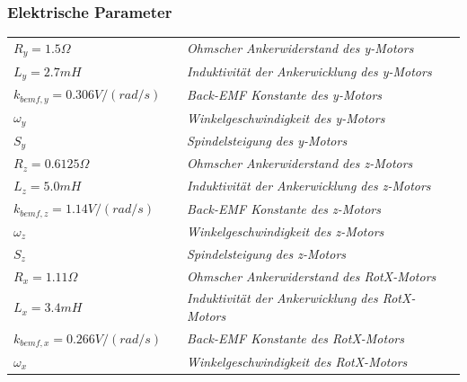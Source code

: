 \documentclass[10pt,a4paper]{iace.report}
\begin{document}
			\subsubsection{Elektrische Parameter}
				\begin{tabular}{lp{1cm}p{8.6cm}}
					$ R_{y}= 1.5 \Omega$ && \textit{Ohmscher Ankerwiderstand des y-Motors}\\
					$ L_{y}= 2.7mH$ &&\textit{Induktivität der Ankerwicklung des y-Motors} \\ 
					$ k_{bemf,y}= 0.306 V/(rad/s)$ &&\textit{Back-EMF Konstante des y-Motors} \\ 
					$ \omega_{y} $ &&\textit{Winkelgeschwindigkeit des y-Motors} \\ 
					$ S_{y} $ &&\textit{Spindelsteigung des y-Motors} \\ 
					$ R_{z}= 0.6125\Omega$ && \textit{Ohmscher Ankerwiderstand des z-Motors}\\
					$ L_{z}= 5.0mH$ &&\textit{Induktivität der Ankerwicklung des z-Motors} \\ 
					$ k_{bemf,z}= 1.14 V/(rad/s)$ &&\textit{Back-EMF Konstante des z-Motors} \\ 
					$ \omega_{z}$ &&\textit{Winkelgeschwindigkeit des z-Motors} \\
					$ S_{z} $ &&\textit{Spindelsteigung des z-Motors} \\  
					$ R_{x}= 1.11\Omega$ && \textit{Ohmscher Ankerwiderstand des RotX-Motors}\\
					$ L_{x}= 3.4mH$ &&\textit{Induktivität der Ankerwicklung des RotX-Motors} \\ 
					$ k_{bemf,x}= 0.266 V/(rad/s)$ &&\textit{Back-EMF Konstante des RotX-Motors} \\ 
					$ \omega_{x} $ &&\textit{Winkelgeschwindigkeit des RotX-Motors} \\ 
				\end{tabular}\leavevmode\\
			
\end{document}
